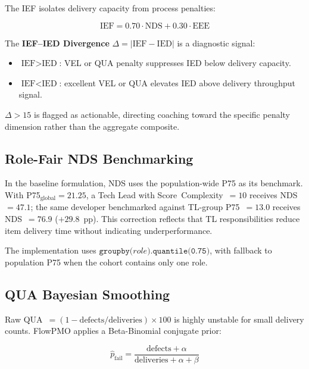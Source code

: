 \documentclass[conference]{IEEEtran}
\begin{document}
The IEF isolates delivery capacity from process penalties:

\begin{equation}
  \text{IEF} = 0.70\cdot\text{NDS} + 0.30\cdot\text{EEE}
  \label{eq:ief}
\end{equation}

The \textbf{IEF--IED Divergence} $\Delta = |\text{IEF} - \text{IED}|$ is a
diagnostic signal:

\begin{itemize}
  \item $\text{IEF} > \text{IED}$: VEL or QUA penalty suppresses IED
    below delivery capacity.
  \item $\text{IEF} < \text{IED}$: excellent VEL or QUA elevates IED above
    delivery throughput signal.
\end{itemize}

$\Delta > 15$ is flagged as actionable, directing coaching toward the specific
penalty dimension rather than the aggregate composite.

\subsection{Role-Fair NDS Benchmarking}
\label{sec:role_nds}

In the baseline formulation, NDS uses the population-wide P75 as its benchmark.
With P75$_\text{global} = 21.25$, a Tech Lead with
Score~Complexity~$=10$ receives NDS~$=47.1$; the same developer benchmarked
against TL-group P75~$=13.0$ receives NDS~$=76.9$ ($+29.8$~pp). This correction
reflects that TL responsibilities reduce item delivery time without indicating
underperformance.

The implementation uses
$\texttt{groupby(}\textit{role}\texttt{).quantile(0.75)}$, with fallback to
population P75 when the cohort contains only one role.

\subsection{QUA Bayesian Smoothing}
\label{sec:bayes_qua}

Raw QUA~$= (1 - \text{defects}/\text{deliveries}) \times 100$ is highly
unstable for small delivery counts. FlowPMO applies a Beta-Binomial conjugate
prior:

\begin{equation}
  \hat{p}_\text{fail} = \frac{\text{defects} + \alpha}{\text{deliveries} + \alpha + \beta}
  \label{eq:bayes}
\end{equation}
\end{document}
